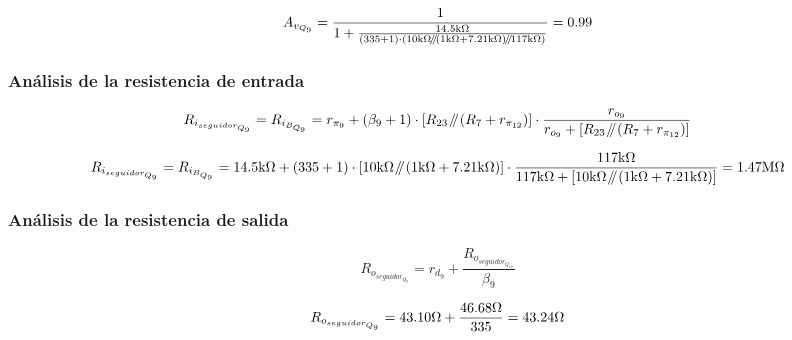 \begin{equation*}
A_{v_{Q_{9}}} = \frac{1}{1 + \frac{ 14.5 \si[per-mode=symbol]{\kilo\ohm} }{  \left(  335 + 1 \right) \cdot \left(  10 \si[per-mode=symbol]{\kilo\ohm} \parallelresistors \left(  1 \si[per-mode=symbol]{\kilo\ohm} + 7.21 \si[per-mode=symbol]{\kilo\ohm} \right) \parallelresistors 117 \si[per-mode=symbol]{\kilo\ohm}  \right)  } } = 0.99
\end{equation*}


\subsubsection{Análisis de la resistencia de entrada}

\begin{equation}
R_{i_{seguidor_{Q_{9}}}} = R_{i_{B_{Q_{9}}}} = r_{\pi_{9}} + \left( \beta_{9} + 1 \right) \cdot  \left[  R_{23} \parallelresistors \left(  R_{7} + r_{\pi_{12}} \right)   \right]  \cdot \frac{  r_{o_{9}} }{  r_{o_{9}} + \left[  R_{23} \parallelresistors \left(  R_{7} + r_{\pi_{12}} \right)   \right]  }
\end{equation}


\begin{equation*}
R_{i_{seguidor_{Q_{9}}}} = R_{i_{B_{Q_{9}}}} = 14.5 \si[per-mode=symbol]{\kilo\ohm} + \left( 335 + 1 \right) \cdot  \left[  10 \si[per-mode=symbol]{\kilo\ohm} \parallelresistors \left(  1 \si[per-mode=symbol]{\kilo\ohm} + 7.21 \si[per-mode=symbol]{\kilo\ohm} \right)   \right]  \cdot \frac{  117 \si[per-mode=symbol]{\kilo\ohm} }{  117 \si[per-mode=symbol]{\kilo\ohm} + \left[  10 \si[per-mode=symbol]{\kilo\ohm} \parallelresistors \left(  1 \si[per-mode=symbol]{\kilo\ohm} + 7.21 \si[per-mode=symbol]{\kilo\ohm} \right)   \right]  } = 1.47 \si[per-mode=symbol]{\mega\ohm}
\end{equation*}

\subsubsection{Análisis de la resistencia de salida}

\begin{equation}
R_{o_{seguidor_{Q_{9}}}} = r_{d_{9}} + \frac{R_{o_{seguidor_{Q_{10}}}}}{\beta_{9}}  
\end{equation}

\begin{equation*}
R_{o_{seguidor_{Q_{9}}}} = 43.10 \si[per-mode=symbol]{\ohm} + \frac{46.68 \si[per-mode=symbol]{\ohm}}{335} = 43.24 \si[per-mode=symbol]{\ohm} 
\end{equation*}



